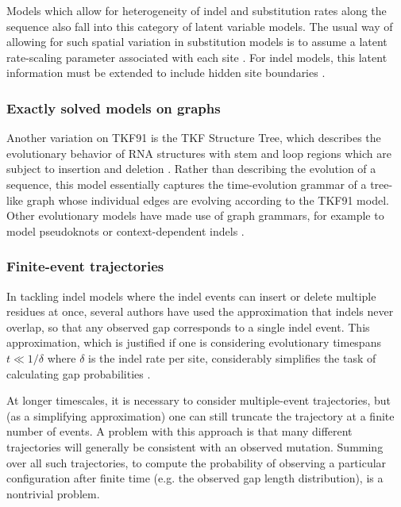 \documentclass{bmcart}
\begin{document}
Models which allow for heterogeneity of indel and substitution rates along the sequence
also fall into this category of latent variable models. The usual way of allowing for such spatial variation
in substitution models is to assume a latent rate-scaling parameter associated with each site \cite{Yang93,Yang94}.
For indel models, this latent information must be extended to include hidden site boundaries \cite{RivasEddy2015}.

\subsubsection*{Exactly solved models on graphs}

Another variation on TKF91 is the TKF Structure Tree, which describes the evolutionary behavior
of RNA structures with stem and loop regions which are subject to insertion and deletion \cite{Holmes2004}.
Rather than describing the evolution of a sequence,
this model essentially captures the time-evolution grammar of a tree-like graph whose
individual edges are evolving according to the TKF91 model.
Other evolutionary models have made use of graph grammars,
for example to model pseudoknots \cite{MatsuiEtAl2005} or context-dependent indels \cite{HickeyBlanchette2011}.

\subsubsection*{Finite-event trajectories}

In tackling indel models where the indel events can insert or delete multiple residues at once,
several authors have used the approximation that indels never overlap,
so that any observed gap corresponds to a single indel event.
This approximation, which is justified if one is considering evolutionary timespans $t \ll 1/\delta$
where $\delta$ is the indel rate per site,
considerably simplifies the task of calculating gap probabilities
\cite{KnudsenMiyamoto2003,RedelingsSuchard2005,SuchardRedelings2006,RedelingsSuchard2007,WestessonEtAlArxiv2011,WestessonEtAl2012,WestessonBarquistHolmes2012}.

At longer timescales, it is necessary to consider multiple-event trajectories,
but (as a simplifying approximation) one can still truncate the trajectory at a finite number of events.
A problem with this approach is that many different trajectories will generally be consistent with an observed mutation.
Summing over all such trajectories, to compute the probability of observing a particular configuration after finite time
(e.g. the observed gap length distribution),
is a nontrivial problem.
\end{document}
